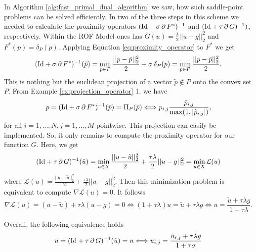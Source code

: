         In Algorithm \ref{alg:fast_primal_dual_algorithm} we saw, how such saddle-point problems can be solved efficiently. In two of the three steps in this scheme we needed to calculate the proximity operators $(\textnormal{Id} + \sigma\,\partial\,F^{\ast})^{-1}$ and $(\textnormal{Id} + \tau\,\partial\,G)^{-1})$, respectively. Within the ROF Model ones has $G(u) = \frac{\lambda}{2} ||u - g||_{2}^{2}$ and $F^{\ast}(p) = \delta_{P}(p)$. Applying Equation \ref{eq:proximity_operator} to $F^{\ast}$ we get
            $$
                (\textnormal{Id} + \sigma\,\partial\,F^{\ast})^{-1}(\tilde{p}) = \min_{p \in P} \frac{||p - \tilde{p}||_{2}^{2}}{2} + \sigma\,\delta_{P}(p) = \min_{p \in P} \frac{||p - \tilde{p}||_{2}^{2}}{2}.
            $$
        This is nothing but the euclidean projection of a vector $\tilde{p} \notin P$ onto the convex set $P$. From Example \ref{ex:projection_operator} 1. we have
            \begin{equation}
                p = (\textnormal{Id} + \sigma\,\partial\,F^{\ast})^{-1}(\tilde{p}) = \Pi_{P}(\tilde{p}) \Longleftrightarrow p_{i,j} \frac{\tilde{p}_{i, j}}{\max(1, |\tilde{p}_{i, j}|)},
            \label{eq:proximity_operator_f_star_rof}
            \end{equation}
        for all $i = 1, ..., N, j = 1, ..., M$ pointwise. This projection can easily be implemented. So, it only remains to compute the proximity operator for our function $G$. Here, we get
            $$
                (\textnormal{Id} + \tau\,\partial\,G)^{-1}(\tilde{u}) = \min_{u \in X} \frac{||u - \tilde{u}||_{2}^{2}}{2} + \frac{\tau\lambda}{2} ||u - g||_{2}^{2} = \min_{u \in X} \mathcal{L}(u)
            $$
        where $\mathcal{L}(u) = \frac{||u - \tilde{u}||_{2}^{2}}{2} + \frac{\tau\lambda}{2} ||u - g||_{2}^{2}$. Then this minimization problem is equivalent to compute $\nabla\mathcal{L}(u) = 0$. It follows
            $$
                \nabla\mathcal{L}(u) = (u - \tilde{u}) + \tau\lambda (u - g) = 0 \Longleftrightarrow (1 + \tau\lambda)u = \tilde{u} + \tau\lambda g \Longleftrightarrow u = \frac{\tilde{u} + \tau\lambda g}{1 + \tau\lambda}.
            $$

        Overall, the following equivalence holds
            \begin{equation}
                u = (\textnormal{Id} + \tau\,\partial\,G)^{-1}(\tilde{u}) = u \Longleftrightarrow u_{i,j} = \frac{\tilde{u}_{i,j} + \tau\lambda g}{1 + \tau\sigma}
            \label{eq:proximity_operator_g_rof}
            \end{equation}

